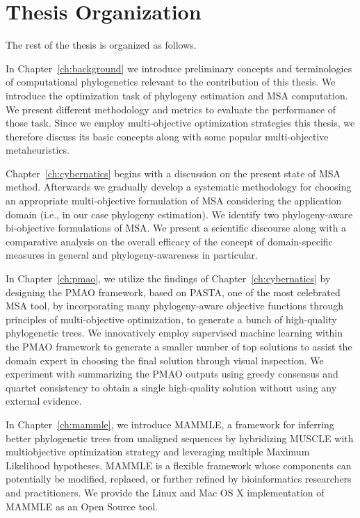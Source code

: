 \section{Thesis Organization}

The rest of the thesis is organized as follows.

In Chapter~\ref{ch:background} we introduce preliminary concepts and terminologies of computational phylogenetics
relevant to the contribution of this thesis. We introduce the optimization task of phylogeny estimation and MSA computation. We present different methodology and metrics to evaluate the performance of those task. Since we employ multi-objective optimization strategies this thesis, we therefore discuss its basic concepts along with some popular multi-objective metaheuristics.

Chapter~\ref{ch:cybernatics} begins with a discussion on the present state of MSA method. Afterwards we gradually develop a systematic methodology for choosing an appropriate multi-objective formulation of MSA considering the application domain (i.e., in our case phylogeny estimation). We identify two phylogeny-aware bi-objective formulations of MSA. We present a scientific discourse along with a comparative analysis on the overall efficacy of the concept of domain-specific measures in general and phylogeny-awareness in particular. 

In Chapter~\ref{ch:pmao}, we utilize the findings of Chapter~\ref{ch:cybernatics} by designing the PMAO framework, based on PASTA, one of the most celebrated MSA tool, by incorporating many phylogeny-aware objective functions through principles of multi-objective optimization, to generate a bunch of high-quality phylogenetic trees. We innovatively employ supervised machine learning within the PMAO framework to generate a smaller number of top solutions to assist the domain expert in choosing the final solution through visual inspection. We experiment with summarizing the PMAO outputs using greedy consensus and quartet consistency to obtain a single high-quality solution without using any external evidence.


In Chapter~\ref{ch:mammle}, we introduce MAMMLE, a framework for inferring better phylogenetic trees from unaligned sequences by hybridizing MUSCLE with multiobjective optimization strategy and leveraging multiple Maximum Likelihood hypotheses. MAMMLE is a flexible framework whose components can potentially be modified, replaced, or further refined by bioinformatics researchers and practitioners. We provide the Linux and Mac OS X implementation of MAMMLE as an Open Source tool.


